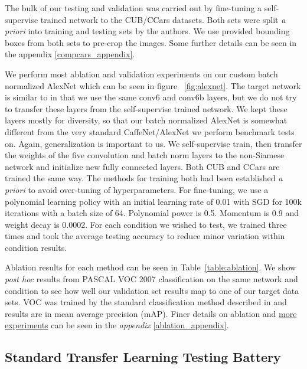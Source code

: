 \documentclass[10pt,twocolumn,letterpaper]{article}
\begin{document}
The bulk of our testing and validation was carried out by fine-tuning a self-supervise trained network to the CUB/CCars datasets. Both sets were split \emph{a priori} into training and testing sets by the authors. We use provided bounding boxes from both sets to pre-crop the images. Some further details can be seen in the appendix \ref{compcars_appendix}.

We perform most ablation and validation experiments on our custom batch normalized AlexNet which can be seen in figure ~\ref{fig:alexnet}. The target network is similar to \cite{Doersch15} in that we use the same conv6 and conv6b layers, but we do not try to transfer these layers from the self-supervise trained network. We kept these layers mostly for diversity, so that our batch normalized AlexNet is somewhat different from the very standard CaffeNet/AlexNet we perform benchmark tests on. Again, generalization is important to us. We self-supervise train, then transfer the weights of the five convolution and batch norm layers to the non-Siamese network and initialize new fully connected layers. Both CUB and CCars are trained the same way. The methods for training both had been established \emph{a priori} to avoid over-tuning of hyperparameters. For fine-tuning, we use a polynomial learning policy with an initial learning rate of 0.01 with SGD for 100k iterations with a batch size of 64. Polynomial power is 0.5. Momentum is 0.9 and weight decay is 0.0002. For each condition we wished to test, we trained three times and took the average testing accuracy to reduce minor variation within condition results. 

Ablation results for each method can be seen in Table~\ref{table:ablation}. We show \emph{post hoc} results from PASCAL VOC 2007 classification on the same network and condition to see how well our validation set results map to one of our target data sets. VOC was trained by the standard classification method described in \cite{Krahenbuhl16} and results are in mean average precision (mAP). Finer details on ablation and \underline{more experiments} can be seen in the \emph{appendix} \ref{ablation_appendix}.

\subsection{Standard Transfer Learning Testing Battery}
\end{document}
